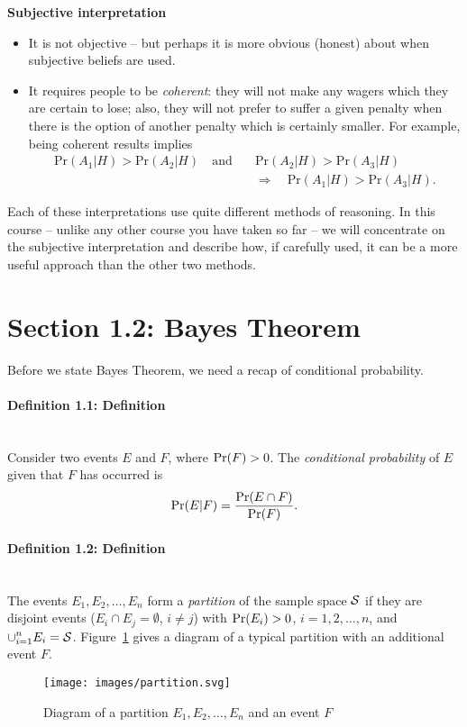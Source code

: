 \textbf{Subjective interpretation}
\begin{itemize}
\item It is not objective -- but perhaps it is more obvious (honest) about when
subjective beliefs are used.
\item It requires people to be {\it coherent}: they will not make any
wagers which they are certain to lose; also, they will not prefer to
suffer a given penalty when there is the option of another penalty
which is certainly smaller. For example, being coherent results implies
\begin{align*}
\text{Pr}(A_1|H)>\text{Pr}(A_2|H)\quad\text{and}\quad &\text{Pr}(A_2|H)>\text{Pr}(A_3|H) \\
&\Longrightarrow\quad \text{Pr}(A_1|H)>\text{Pr}(A_3|H).
\end{align*}
\end{itemize}

Each of these interpretations use quite different methods of
reasoning. In this course -- unlike any other course you have taken so far -- we will concentrate on the subjective interpretation and
describe how, if carefully used, it can be a more useful approach than
the other two methods.

\section{Section 1.2: Bayes Theorem}
Before we state Bayes Theorem, we need a recap of conditional
probability.

\paragraph{Definition 1.1: Definition}{~\\
Consider two events $E$ and $F$, where $\textnormal{Pr}(F)>0$. The
\textit{conditional probability} of $E$ given that $F$ has occurred is
$$
\textnormal{Pr}(E|F)=\frac{\textnormal{Pr}(E\cap F)}{\textnormal{Pr}(F)}.
$$}

\paragraph{Definition 1.2: Definition}{~\\
The events $E_1,E_2,\ldots,E_n$ form a {\it partition} of the sample
space ${\cal S}$ if they are disjoint events ($E_i\cap E_j=\emptyset$,
$i\neq j$) with $\textnormal{Pr}(E_i)>0$, $i=1,2,\ldots,n$, and
$\displaystyle{\cup_{i=1}^n E_i}={\cal S}$.
Figure~\ref{fig:partition} gives a diagram of a typical partition with
an additional event $F$.

\begin{figure}[ht]

\texttt{[image: images/partition.svg]}
\caption{Diagram of a partition $E_1,E_2,\ldots,E_n$ and an event $F$}
\label{fig:partition}

\end{figure}}
\clearpage
